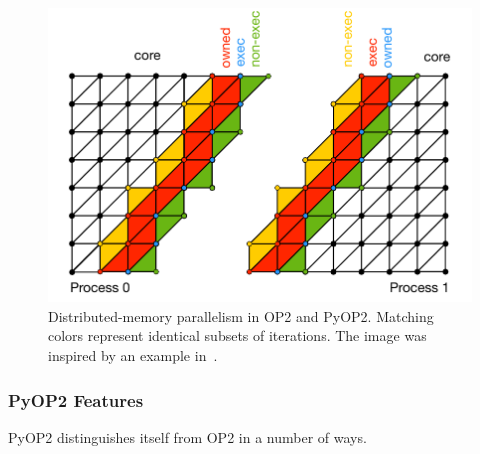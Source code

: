 \begin{figure}
\begin{CenteredBox}
\includegraphics[scale=0.8]{background/figures/mpi_mesh}
\end{CenteredBox}
\caption{Distributed-memory parallelism in OP2 and PyOP2. Matching colors represent identical subsets of iterations. The image was inspired by an example in~\cite{florian-thesis}.}
\label{fig:bkg:sets-division}
\end{figure}



\subsubsection{PyOP2 Features}
PyOP2 distinguishes itself from OP2 in a number of ways.

